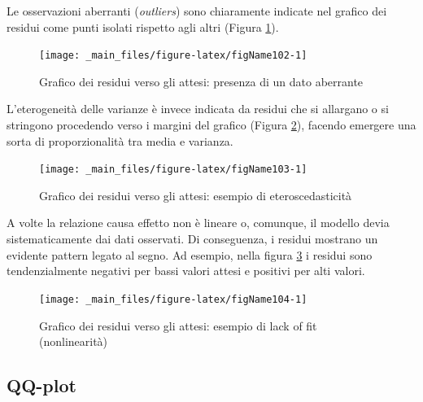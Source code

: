 \documentclass[a4paper,12pt,oneside]{book}
\begin{document}
Le osservazioni aberranti (\emph{outliers}) sono chiaramente indicate nel grafico dei residui come punti isolati rispetto agli altri (Figura \ref{fig:figName102}).

\begin{figure}

{\centering \texttt{[image: \_main\_files/figure-latex/figName102-1]} 

}

\caption{Grafico dei residui verso gli attesi: presenza di un dato aberrante}\label{fig:figName102}
\end{figure}

L'eterogeneità delle varianze è invece indicata da residui che si allargano o si stringono procedendo verso i margini del grafico (Figura \ref{fig:figName103}), facendo emergere una sorta di proporzionalità tra media e varianza.

\begin{figure}

{\centering \texttt{[image: \_main\_files/figure-latex/figName103-1]} 

}

\caption{Grafico dei residui verso gli attesi: esempio di eteroscedasticità}\label{fig:figName103}
\end{figure}

A volte la relazione causa effetto non è lineare o, comunque, il modello devia sistematicamente dai dati osservati. Di conseguenza, i residui mostrano un evidente pattern legato al segno. Ad esempio, nella figura \ref{fig:figName104} i residui sono tendenzialmente negativi per bassi valori attesi e positivi per alti valori.

\begin{figure}

{\centering \texttt{[image: \_main\_files/figure-latex/figName104-1]} 

}

\caption{Grafico dei residui verso gli attesi: esempio di lack of fit (nonlinearità)}\label{fig:figName104}
\end{figure}

\hypertarget{qq-plot}{%
\subsection{QQ-plot}\label{qq-plot}}
\end{document}
